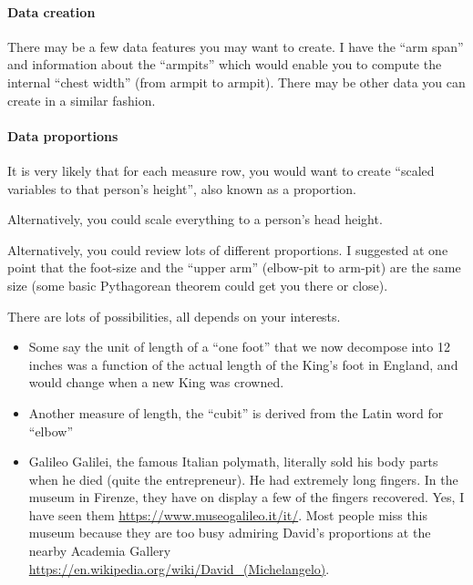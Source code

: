 \documentclass[]{article}
\begin{document}
\hypertarget{data-creation}{%
\paragraph{Data creation}\label{data-creation}}

There may be a few data features you may want to create. I have the
``arm span'' and information about the ``armpits'' which would enable
you to compute the internal ``chest width'' (from armpit to armpit).
There may be other data you can create in a similar fashion.

\hypertarget{data-proportions}{%
\paragraph{Data proportions}\label{data-proportions}}

It is very likely that for each measure row, you would want to create
``scaled variables to that person's height'', also known as a
proportion.

Alternatively, you could scale everything to a person's head height.

Alternatively, you could review lots of different proportions. I
suggested at one point that the foot-size and the ``upper arm''
(elbow-pit to arm-pit) are the same size (some basic Pythagorean theorem
could get you there or close).

There are lots of possibilities, all depends on your interests.

\begin{itemize}
\item
  Some say the unit of length of a ``one foot'' that we now decompose
  into 12 inches was a function of the actual length of the King's foot
  in England, and would change when a new King was crowned.
\item
  Another measure of length, the ``cubit'' is derived from the Latin
  word for ``elbow''
\item
  Galileo Galilei, the famous Italian polymath, literally sold his body
  parts when he died (quite the entrepreneur). He had extremely long
  fingers. In the museum in Firenze, they have on display a few of the
  fingers recovered. Yes, I have seen them
  \url{https://www.museogalileo.it/it/}. Most people miss this museum
  because they are too busy admiring David's proportions at the nearby
  Academia Gallery
  \url{https://en.wikipedia.org/wiki/David_(Michelangelo)}.
\end{itemize}
\end{document}
